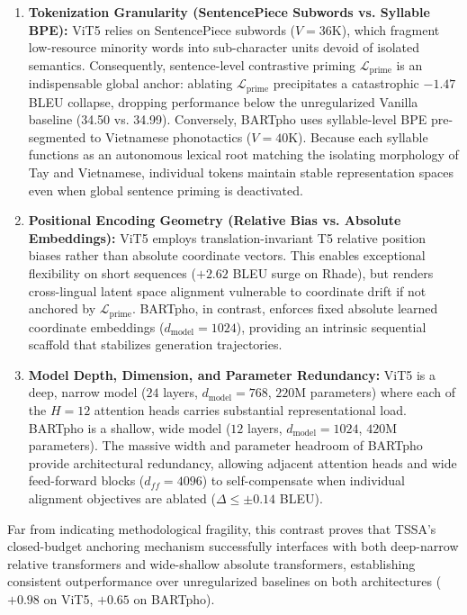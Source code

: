 \documentclass[11pt]{article}
\begin{document}
\begin{enumerate}[leftmargin=*]
    \item \textbf{Tokenization Granularity (SentencePiece Subwords vs. Syllable BPE):} ViT5 relies on SentencePiece subwords ($V=36\text{K}$), which fragment low-resource minority words into sub-character units devoid of isolated semantics. Consequently, sentence-level contrastive priming $\mathcal{L}_{\text{prime}}$ is an indispensable global anchor: ablating $\mathcal{L}_{\text{prime}}$ precipitates a catastrophic $-1.47$ BLEU collapse, dropping performance below the unregularized Vanilla baseline (34.50 vs. 34.99). Conversely, BARTpho uses syllable-level BPE pre-segmented to Vietnamese phonotactics ($V=40\text{K}$). Because each syllable functions as an autonomous lexical root matching the isolating morphology of Tay and Vietnamese, individual tokens maintain stable representation spaces even when global sentence priming is deactivated.
    \item \textbf{Positional Encoding Geometry (Relative Bias vs. Absolute Embeddings):} ViT5 employs translation-invariant T5 relative position biases rather than absolute coordinate vectors. This enables exceptional flexibility on short sequences ($+2.62$ BLEU surge on Rhade), but renders cross-lingual latent space alignment vulnerable to coordinate drift if not anchored by $\mathcal{L}_{\text{prime}}$. BARTpho, in contrast, enforces fixed absolute learned coordinate embeddings ($d_{\text{model}}=1024$), providing an intrinsic sequential scaffold that stabilizes generation trajectories.
    \item \textbf{Model Depth, Dimension, and Parameter Redundancy:} ViT5 is a deep, narrow model ($24$ layers, $d_{\text{model}}=768$, $220\text{M}$ parameters) where each of the $H=12$ attention heads carries substantial representational load. BARTpho is a shallow, wide model ($12$ layers, $d_{\text{model}}=1024$, $420\text{M}$ parameters). The massive width and parameter headroom of BARTpho provide architectural redundancy, allowing adjacent attention heads and wide feed-forward blocks ($d_{ff}=4096$) to self-compensate when individual alignment objectives are ablated ($\Delta \le \pm 0.14$ BLEU).
\end{enumerate}
Far from indicating methodological fragility, this contrast proves that TSSA's closed-budget anchoring mechanism successfully interfaces with both deep-narrow relative transformers and wide-shallow absolute transformers, establishing consistent outperformance over unregularized baselines on both architectures ($+0.98$ on ViT5, $+0.65$ on BARTpho).
\end{document}
